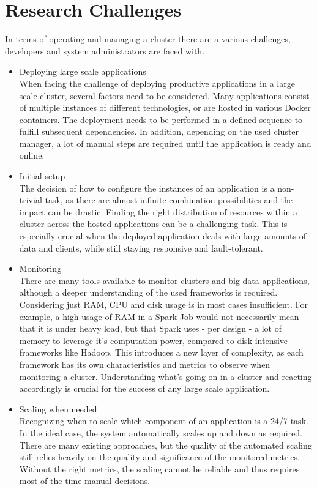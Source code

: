 \section{Research Challenges}
In terms of operating and managing a cluster there are a various challenges, developers and system administrators are faced with.\\
\begin{itemize}
    \item Deploying large scale applications\\
          When facing the challenge of deploying productive applications in a large scale cluster, several factors need to be considered.
          Many applications consist of multiple instances of different technologies, or are hosted in various Docker containers.
          The deployment needs to be performed in a defined sequence to fulfill subsequent dependencies.
          In addition, depending on the used cluster manager, a lot of manual steps are required until the application is ready and online.
    \item Initial setup\\
          The decision of how to configure the instances of an application is a non-trivial task, as there are almost infinite combination possibilities and the impact can be drastic.
          Finding the right distribution of resources within a cluster across the hosted applications can be a challenging task.
          This is especially crucial when the deployed application deals with large amounts of data and clients, while still staying responsive and fault-tolerant.
    \item Monitoring\\
          There are many tools available to monitor clusters and big data applications, although a deeper understanding of the used frameworks is required.
          Considering just RAM, CPU and disk usage is in most cases insufficient.
          For example, a high usage of RAM in a Spark Job would not necessarily mean that it is under heavy load, but that Spark uses - per design - a lot of memory to leverage it's computation power, compared to disk intensive frameworks like Hadoop.
          This introduces a new layer of complexity, as each framework has its own characteristics and metrics to observe when monitoring a cluster.
          Understanding what's going on in a cluster and reacting accordingly is crucial for the success of any large scale application.
    \item Scaling when needed\\
          Recognizing when to scale which component of an application is a 24/7 task.
          In the ideal case, the system automatically scales up and down as required.
          There are many existing approaches, but the quality of the automated scaling still relies heavily on the quality and significance of the monitored metrics.
          Without the right metrics, the scaling cannot be reliable and thus requires most of the time manual decisions.
\end{itemize}

